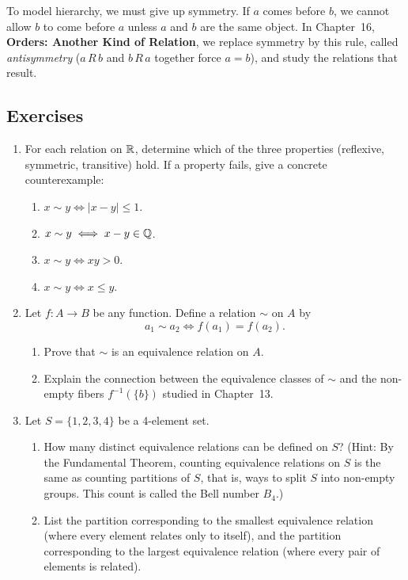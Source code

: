 To model hierarchy, we must give up symmetry. If $a$ comes before $b$, we cannot allow $b$ to come before $a$ unless $a$ and $b$ are the same object. In Chapter~16, \textbf{Orders: Another Kind of Relation}, we replace symmetry by this rule, called \emph{antisymmetry} ($a \, R \, b$ and $b \, R \, a$ together force $a = b$), and study the relations that result.

\subsection{Exercises}

\begin{enumerate}
\item For each relation on $\mathbb{R}$, determine which of the three properties (reflexive, symmetric, transitive) hold. If a property fails, give a concrete counterexample:
\begin{enumerate}[label=(\alph*)]
\item $x \sim y \iff |x - y| \le 1$.
\item $x \sim y \iff x - y \in \mathbb{Q}$.
\item $x \sim y \iff xy > 0$.
\item $x \sim y \iff x \le y$.
\end{enumerate}

\item Let $f: A \to B$ be any function. Define a relation $\sim$ on $A$ by
\[
a_1 \sim a_2 \iff f(a_1) = f(a_2).
\]
\begin{enumerate}[label=(\alph*)]
\item Prove that $\sim$ is an equivalence relation on $A$.
\item Explain the connection between the equivalence classes of $\sim$ and the non-empty fibers $f^{-1}(\{b\})$ studied in Chapter~13.
\end{enumerate}

\item Let $S = \{1, 2, 3, 4\}$ be a 4-element set.
\begin{enumerate}[label=(\alph*)]
\item How many distinct equivalence relations can be defined on $S$? (Hint: By the Fundamental Theorem, counting equivalence relations on $S$ is the same as counting partitions of $S$, that is, ways to split $S$ into non-empty groups. This count is called the Bell number $B_4$.)
\item List the partition corresponding to the smallest equivalence relation (where every element relates only to itself), and the partition corresponding to the largest equivalence relation (where every pair of elements is related).
\end{enumerate}


\end{enumerate}
